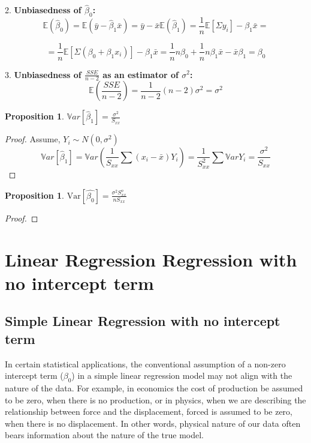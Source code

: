 \documentclass[12pt,a4paper,oneside]{book} %
\newtheorem{proposition}[theorem]{Proposition}
\newcommand{\Var}{\mathrm{Var}}
\begin{document}
2. \textbf{Unbiasedness of $\hat{\beta}_0$:}
\[
\mathbb{E}(\hat{\beta}_0) = \mathbb{E}(\bar{y} - \hat{\beta}_1 \bar{x}) = \bar{y} - \bar{x} \mathbb{E}(\hat{\beta}_1) = \frac{1}{n}\mathbb{E}[\Sigma y_i]-\beta_1 \bar{x} =
\] 

\[
	= \frac{1}{n}\mathbb{E}[\Sigma (\beta_0+\beta_1x_i)]-\beta_1 \bar{x} 
	= \frac{1}{n}n\beta_0+\frac{1}{n}n\beta_1\bar{x}-\bar{x}\beta_1=\beta_0	
\]


3. \textbf{Unbiasedness of $\frac{SSE}{n-2}$ as an estimator of $\sigma^2$:}
\[
\mathbb{E}\left(\frac{SSE}{n-2}\right) = \frac{1}{n-2} (n - 2) \sigma^2 = \sigma^2
\]


\begin{proposition}
	$\mathbb{V}ar[\hat{\beta}_1] = \frac{\sigma^2}{S_{xx}}$
\end{proposition}

\begin{proof}
	Assume, $Y_i \sim N(0, \sigma^2) $
	\[
		\mathbb{V}ar[\hat{\beta}_1] = \mathbb{V}ar (\frac{1}{S_{xx}}\sum (x_i-\bar{x})Y_i) = \frac{1}{S_{xx}^2}\sum \mathbb{V}ar Y_i = \frac{\sigma^2}{S_{xx}}
	\]
\end{proof}

\begin{proposition}
	$\Var [\hat{\beta_0}]= \frac{\sigma^2 S_{xx}^o}{n S_{xx}} $
\end{proposition}



\begin{proof}
\end{proof}

	\clearpage





\chapter{Linear Regression Regression with no intercept term}

	\section{Simple Linear Regression with no intercept term}

	In certain statistical applications, the conventional assumption of a non-zero intercept term ($\beta_0$) in a simple linear regression model may not align with the nature of the data. For example, in economics the cost of production be assumed to be zero, when there is no production, or in physics, when we are describing the relationship between force and the displacement, forced is assumed to be zero, when there is no displacement. In other words, physical nature of our data often bears information about the nature of the true model. 
	
\end{document}
